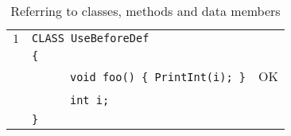 \documentclass{article}
\begin{document}
\begin{table}[h]
\begin{tabular}{|l|l|l|}
\hline
 $1$ & \verb"CLASS UseBeforeDef"                 &    \\
     & \verb"{"                                  &    \\
     & ~ ~ ~ ~\verb"void foo() { PrintInt(i); }" & OK \\
     & ~ ~ ~ ~\verb"int i;"                      &    \\
     & \verb"}"                                  &    \\
\hline
\end{tabular}
\caption{Referring to classes, methods and data members
\label{Table_Code_Examples_Use_Before_Def}}
\end{table}
\newpage
\end{document}
